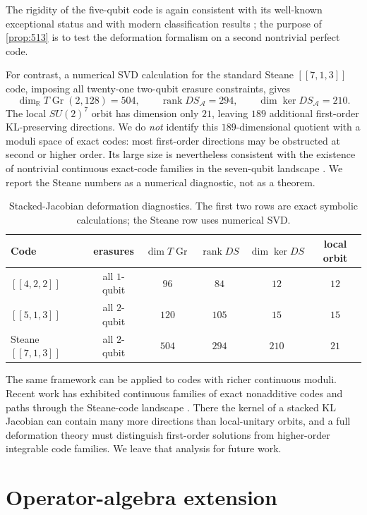 \documentclass[11pt]{article}
\theoremstyle{definition}
\newcommand{\Gr}{\operatorname{Gr}}
\newcommand{\rank}{\operatorname{rank}}
\newcommand{\R}{\mathbb R}
\newcommand{\1}{\mathbf 1}
\begin{document}
The rigidity of the five-qubit code is again consistent with its well-known exceptional status and with modern classification results \cite{Tan2025}; the purpose of \cref{prop:513} is to test the deformation formalism on a second nontrivial perfect code.

For contrast, a numerical SVD calculation for the standard Steane $[[7,1,3]]$ code, imposing all twenty-one two-qubit erasure constraints, gives
\[
\dim_{\R}T\Gr(2,128)=504,\qquad
\rank DS_{\mathcal A}=294,\qquad
\dim\ker DS_{\mathcal A}=210.
\]
The local $SU(2)^7$ orbit has dimension only $21$, leaving $189$ additional first-order KL-preserving directions.  We do \emph{not} identify this $189$-dimensional quotient with a moduli space of exact codes: most first-order directions may be obstructed at second or higher order.  Its large size is nevertheless consistent with the existence of nontrivial continuous exact-code families in the seven-qubit landscape \cite{DuZhangPoonZeng2024}.  We report the Steane numbers as a numerical diagnostic, not as a theorem.

\begin{table}[t]
\centering
\caption{Stacked-Jacobian deformation diagnostics.  The first two rows are exact symbolic calculations; the Steane row uses numerical SVD.}
\label{tab:rigidity}
\begin{tabular}{lccccc}
\toprule
Code & erasures & $\dim T\Gr$ & $\rank DS$ & $\dim\ker DS$ & local orbit\\
\midrule
$[[4,2,2]]$ & all $1$-qubit & $96$ & $84$ & $12$ & $12$\\
$[[5,1,3]]$ & all $2$-qubit & $120$ & $105$ & $15$ & $15$\\
Steane $[[7,1,3]]$ & all $2$-qubit & $504$ & $294$ & $210$ & $21$\\
\bottomrule
\end{tabular}
\end{table}


The same framework can be applied to codes with richer continuous moduli.  Recent work has exhibited continuous families of exact nonadditive codes and paths through the Steane-code landscape \cite{DuZhangPoonZeng2024}.  There the kernel of a stacked KL Jacobian can contain many more directions than local-unitary orbits, and a full deformation theory must distinguish first-order solutions from higher-order integrable code families.  We leave that analysis for future work.

\section{Operator-algebra extension}
\label{sec:algebra}
\end{document}
